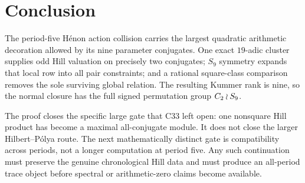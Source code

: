 \section{Conclusion}

The period-five H\'enon action collision carries the largest quadratic
arithmetic decoration allowed by its nine parameter conjugates.  One exact
\(19\)-adic cluster supplies odd Hill valuation on precisely two conjugates;
\(S_9\) symmetry expands that local row into all pair constraints; and a
rational square-class comparison removes the sole surviving global
relation.  The resulting Kummer rank is nine, so the normal closure has the
full signed permutation group \(C_2\mathbin{\wr} S_9\).

The proof closes the specific large gate that C33 left open: one nonsquare
Hill product has become a maximal all-conjugate module.  It does not close
the larger Hilbert--P\'olya route.  The next mathematically distinct gate is
compatibility across periods, not a longer computation at period five.  Any
such continuation must preserve the genuine chronological Hill data and
must produce an all-period trace object before spectral or arithmetic-zero
claims become available.

